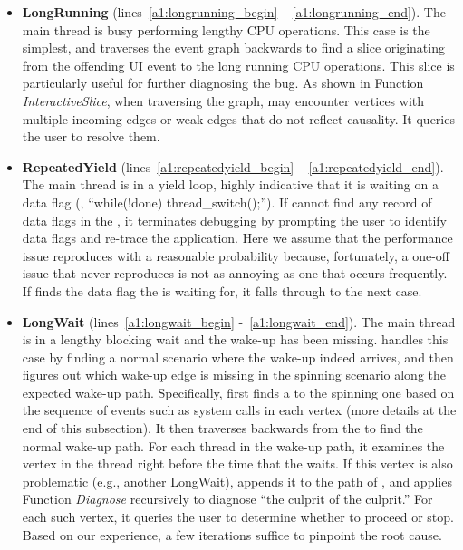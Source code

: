 \begin{itemize}
	\item \textbf{LongRunning} (lines~\ref{a1:longrunning_begin}
		-~\ref{a1:longrunning_end}). The main thread is busy performing lengthy
		CPU operations. This case is the simplest, and \xxx traverses the event
		graph backwards to find a slice originating from the offending UI event
		to the long running CPU operations. This slice is particularly useful for
		further diagnosing the bug. As shown in Function \textit{InteractiveSlice},
                when traversing the graph, \xxx may encounter vertices with multiple
                incoming edges or weak edges that do not reflect causality. It queries
                the user to resolve them.

	\item \textbf{RepeatedYield} (lines~\ref{a1:repeatedyield_begin}
		-~\ref{a1:repeatedyield_end}). The main thread is in a yield loop,
		highly indicative that it is waiting on a data flag (\eg, ``while(!done)
		thread\_switch();''). If \xxx cannot find any record of data flags in the
		\spinningnode, it terminates debugging by prompting the user to identify data
		flags and re-trace the application. Here we assume that the performance issue
		reproduces with a reasonable probability because, fortunately, a one-off issue
		that never reproduces is not as annoying as one that occurs frequently. If
		\xxx finds the data flag the \spinningnode is waiting for, it falls through to
		the next case.

	\item \textbf{LongWait} (lines~\ref{a1:longwait_begin}
		-~\ref{a1:longwait_end}). The main thread is in a lengthy blocking wait and
		the wake-up has been missing. \xxx handles this case by finding a normal
		scenario where the wake-up indeed arrives, and then figures out which wake-up
		edge is missing in the spinning scenario along the expected wake-up path.
                Specifically, \xxx first finds a \similarnode to the spinning one based
		on the sequence of events such as system calls in each vertex (more details
                at the end of this subsection). It then traverses backwards from the \similarnode
                to find the normal wake-up path. For each thread in the wake-up path, it examines
                the vertex in the thread right before the time that the \spinningnode waits. If this
                vertex is also problematic (e.g., another LongWait), \xxx appends it to the path of
                \rootcausenodes, and applies
                Function \textit{Diagnose} recursively to diagnose ``the culprit of the culprit.''
                For each such vertex, it queries the user to determine whether to proceed or stop.
                Based on our experience, a few iterations suffice to pinpoint the root cause.

\end{itemize}

